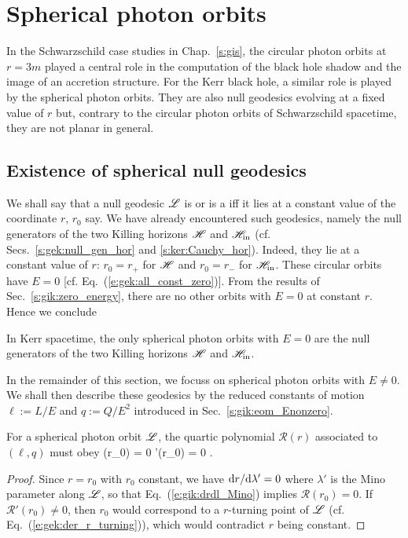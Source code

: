 
\section{Spherical photon orbits} \label{s:gik:spherical_orbits}

In the Schwarzschild case studies in Chap.~\ref{s:gis}, the circular photon
orbits at $r=3m$ played a central role in the computation of
the black hole shadow and the image of an accretion structure.
For the Kerr black hole, a similar role is played by the spherical photon
orbits. They are also null geodesics evolving at a fixed value of $r$ but, contrary
to the circular photon orbits of Schwarzschild spacetime, they are not planar
in general.


\subsection{Existence of spherical null geodesics} \label{s:gik:spher_existence}

We shall say that a null geodesic $\mathscr{L}$ is  or
is a  iff it lies at a constant value of the coordinate $r$, $r_0$ say.
We have already encountered such geodesics, namely the null generators of the two Killing horizons
$\mathscr{H}$ and $\mathscr{H}_{\rm in}$ (cf. Secs.~\ref{s:gek:null_gen_hor} and \ref{s:ker:Cauchy_hor}).
Indeed, they lie at a constant value of $r$: $r_0 = r_+$ for
$\mathscr{H}$ and $r_0 = r_-$ for $\mathscr{H}_{\rm in}$.  These circular orbits have $E=0$
[cf. Eq.~(\ref{e:gek:all_const_zero})].
From the results of Sec.~\ref{s:gik:zero_energy}, there are no other orbits with $E=0$ at constant $r$.
Hence we conclude
\begin{greybox}
In Kerr spacetime, the only spherical photon orbits with $E=0$ are the null generators of the two Killing horizons $\mathscr{H}$ and $\mathscr{H}_{\rm in}$.
\end{greybox}
In the remainder of this section, we focuss on spherical photon orbits with $E\neq 0$.
We shall then describe these geodesics by the reduced constants of motion $\ell := L/E$
and $q := Q/E^2$ introduced in Sec.~\ref{s:gik:eom_Enonzero}.

For a spherical photon orbit $\mathscr{L}$,
the quartic polynomial $\mathcal{R}(r)$ associated to $(\ell,q)$
must obey
\be \label{e:gik:R_Rp_r0_zero}
    (r_0) = 0 \qand {}'(r_0) = 0 .
\ee
\begin{proof}
Since $r=r_0$ with $r_0$ constant, we have $\mathrm{d} r/\mathrm{d}\lambda' = 0$ where $\lambda'$ is the Mino parameter along $\mathscr{L}$, so
that Eq.~(\ref{e:gik:drdl_Mino}) implies $\mathcal{R}(r_0) = 0$. If $\mathcal{R}'(r_0) \neq 0$,
then $r_0$ would correspond to a $r$-turning point of $\mathscr{L}$  (cf. Eq.~(\ref{e:gek:der_r_turning})),
which would contradict $r$ being constant.
\end{proof}

